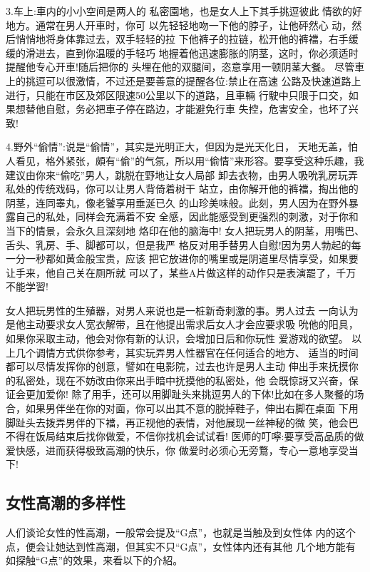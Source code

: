 \documentclass[12pt,UTF8]{ctexbook}
\begin{document}
3.车上:車内的小小空间是两人的
私密園地，也是女人上下其手挑逗彼此
情欲的好地方。通常在男人开車时，你可
以先轻轻地吻一下他的脖子，让他砰然心
动，然后悄悄地将身体靠过去，双手轻轻的拉
下他裤子的拉链，松开他的裤襠，右手缓缓的滑进去，直到你温暖的手轻巧
地握着他迅速膨胀的阴茎，这时，你必须适时提醒他专心开車!随后把你的
头埋在他的双腿间，恣意享用一顿阴茎大餐。
尽管車上的挑逗可以很激情，不过还是要善意的提醒各位:禁止在高速
公路及快速道路上进行，只能在市区及郊区限速50公里以下的道路，且車輛
行駛中只限于口交，如果想替他自慰，务必把車子停在路边，才能避免行車
失控，危害安全，也坏了兴致!

4.野外“偷情”:说是“偷情”，其实是光明正大，但因为是光天化日，
天地无盖，怕人看见，格外紧张，頗有“偷”的气氛，所以用“偷情”来形容。要享受这种乐趣，我建议由你来“偷吃”男人，跳脱在野地让女人局部
卸去衣物，由男人吸吮乳房玩弄私处的传统戏码，你可以让男人背倚着树干
站立，由你解开他的裤襠，掏出他的阴茎，连同睾丸，像老饕享用垂涎已久
的山珍美味般。此刻，男人因为在野外暴露自己的私处，同样会充满着不安
全感，因此能感受到更强烈的刺激，对于你和当下的情景，会永久且深刻地
烙印在他的脑海中!
女人把玩男人的阴茎，用嘴巴、舌头、乳房、手、脚都可以，但是我严
格反对用手替男人自慰!因为男人勃起的每一分一秒都如黄金般宝贵，应该
把它放进你的嘴里或是阴道里尽情享受，如果要让手来，他自己关在厕所就
可以了，某些A片做这样的动作只是表演罷了，千万不能学習!

女人把玩男性的生殖器，对男人来说也是一桩新奇刺激的事。男人过去
一向认为是他主动要求女人宽衣解带，且在他提出需求后女人才会应要求吸
吮他的阳具，如果你采取主动，他会对你有新的认识，会增加日后和你玩性
爱游戏的欲望。
以上几个调情方式供你参考，其实玩弄男人性器官在任何适合的地方、
适当的时间都可以尽情发挥你的创意，譬如在电影院，过去也许是男人主动
伸出手来抚摸你的私密处，现在不妨改由你来出手暗中抚摸他的私密处，他
会既惊訝又兴奋，保证会更加爱你!
除了用手，还可以用脚趾头来挑逗男人的下体!比如在多人聚餐的场
合，如果男伴坐在你的对面，你可以出其不意的脱掉鞋子，伸出右脚在桌面
下用脚趾头去拨弄男伴的下襠，再正视他的表情，对他展现一丝神秘的微
笑，他会巴不得在饭局结束后找你做爱，不信你找机会试试看!
医师的叮嚀:要享受高品质的做爱快感，进而获得极致高潮的快乐，你
做爱时必须心无旁鶩，专心一意地享受当下!

\subsection{女性高潮的多样性}

人们谈论女性的性高潮，一般常会提及“G点”，也就是当触及到女性体
内的这个点，便会让她达到性高潮，但其实不只“G点”，女性体内还有其他
几个地方能有如探触“G点”的效果，来看以下的介紹。
\end{document}
